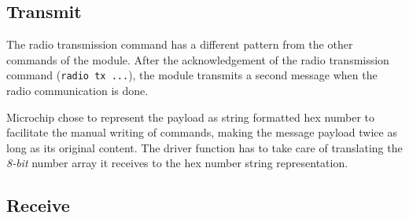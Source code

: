 
%



\subsection{Transmit}

The radio transmission command has a different pattern from the other commands
of the module.
After the acknowledgement of the radio transmission command (\lstinline{radio tx ...}),
the module transmits a second message when the radio communication is done.



Microchip chose to represent the payload as string formatted hex number to
facilitate the manual writing of commands, making the message payload twice as
long as its original content.
The driver function has to take care of translating the \emph{8-bit} number
array it receives to the hex number string representation.

\subsection{Receive}


